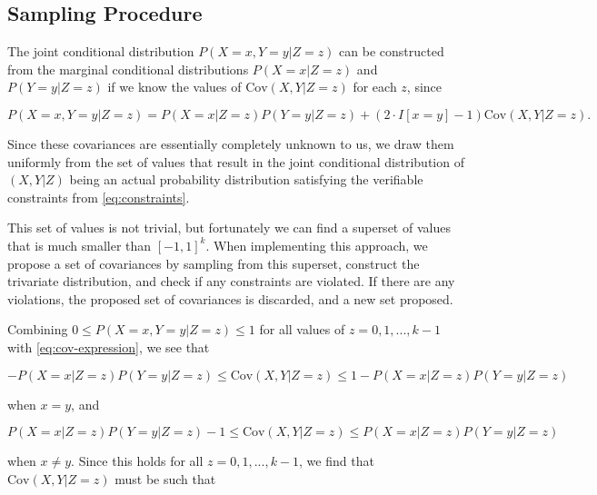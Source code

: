 \documentclass[
]{article}
\theoremstyle{plain}
\begin{document}
{\hypertarget{sampling-procedure}{%
\subsection{Sampling Procedure}\label{sampling-procedure}}

The joint conditional distribution \(P(X = x, Y = y | Z = z)\) can be constructed from the marginal conditional distributions \(P(X = x | Z = z)\) and \(P(Y = y | Z = z)\) if we know the values of \(\text{Cov}(X, Y | Z = z)\) for each \(z\), since

\begin{equation}
P(X = x, Y = y | Z = z) = P(X = x | Z = z)P(Y = y | Z = z) + (2\cdot I[x = y] - 1)\text{Cov}(X, Y | Z = z). \label{eq:cov-expression}
\end{equation}

Since these covariances are essentially completely unknown to us, we draw them uniformly from the set of values that result in the joint conditional distribution of \((X,Y|Z)\) being an actual probability distribution satisfying the verifiable constraints from \eqref{eq:constraints}.

This set of values is not trivial, but fortunately we can find a superset of values that is much smaller than \([-1,1]^k\). When implementing this approach, we propose a set of covariances by sampling from this superset, construct the trivariate distribution, and check if any constraints are violated. If there are any violations, the proposed set of covariances is discarded, and a new set proposed.

Combining \(0 \le P(X = x, Y = y | Z = z) \le 1\) for all values of \(z = 0, 1, ..., k-1\) with \eqref{eq:cov-expression}, we see that

\begin{equation*}
-P(X = x | Z = z) P(Y = y | Z = z) \le \text{Cov}(X, Y | Z = z) \le 1 - P(X = x | Z = z)P(Y = y | Z = z)
\end{equation*}

when \(x = y\), and

\begin{equation*}
P(X = x | Z = z) P(Y = y | Z = z) - 1 \le \text{Cov}(X, Y | Z = z) \le P(X = x | Z = z)P(Y = y | Z = z)
\end{equation*}

when \(x \neq y\). Since this holds for all \(z = 0,1,...,k-1\), we find that \(\text{Cov}(X, Y | Z = z)\) must be such that

}
\end{document}
